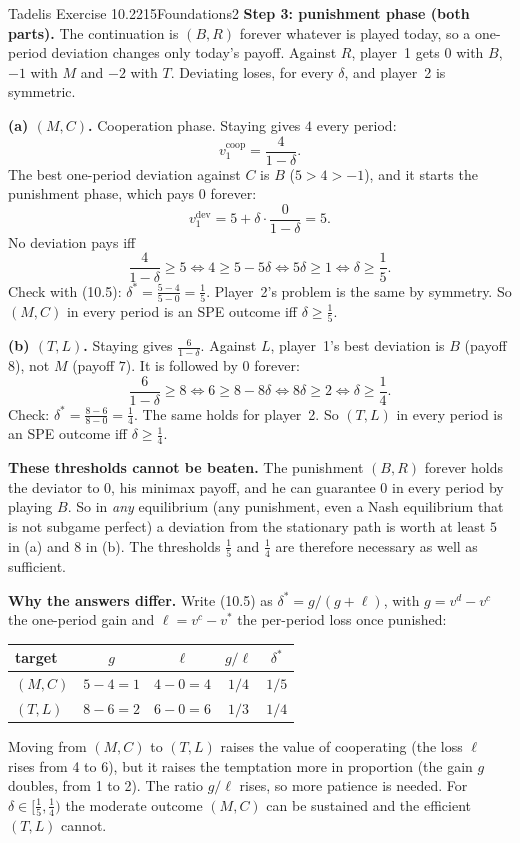 \begin{exsol}{Tadelis Exercise 10.2}{215}{Foundations}{2}
\textbf{Step 3: punishment phase (both parts).} The continuation is $(B,R)$ forever whatever is
played today, so a one-period deviation changes only today's payoff. Against $R$, player~1 gets
$0$ with $B$, $-1$ with $M$ and $-2$ with $T$. Deviating loses, for every $\delta$, and player~2 is
symmetric.

\textbf{(a) $(M,C)$.} Cooperation phase. Staying gives $4$ every period:
\[
  v_1^{\text{coop}} = \frac{4}{1-\delta} .
\]
The best one-period deviation against $C$ is $B$ ($5 > 4 > -1$), and it starts the punishment
phase, which pays $0$ forever:
\[
  v_1^{\text{dev}} = 5 + \delta\cdot\frac{0}{1-\delta} = 5 .
\]
No deviation pays iff
\[
  \frac{4}{1-\delta} \ge 5 \iff 4 \ge 5 - 5\delta \iff 5\delta \ge 1 \iff \delta \ge \frac15 .
\]
Check with (10.5): $\delta^* = \frac{5-4}{5-0} = \frac15$. Player~2's problem is the same by
symmetry. So $(M,C)$ in every period is an SPE outcome iff $\delta \ge \frac15$.

\textbf{(b) $(T,L)$.} Staying gives $\frac{6}{1-\delta}$. Against $L$, player~1's best deviation is
$B$ (payoff $8$), not $M$ (payoff $7$). It is followed by $0$ forever:
\[
  \frac{6}{1-\delta} \ge 8 \iff 6 \ge 8 - 8\delta \iff 8\delta \ge 2 \iff \delta \ge \frac14 .
\]
Check: $\delta^* = \frac{8-6}{8-0} = \frac14$. The same holds for player~2. So $(T,L)$ in every
period is an SPE outcome iff $\delta \ge \frac14$.

\textbf{These thresholds cannot be beaten.} The punishment $(B,R)$ forever holds the deviator to
$0$, his minimax payoff, and he can guarantee $0$ in every period by playing $B$. So in \emph{any}
equilibrium (any punishment, even a Nash equilibrium that is not subgame perfect) a deviation from
the stationary path is worth at least $5$ in (a) and $8$ in (b). The thresholds $\frac15$ and $\frac14$
are therefore necessary as well as sufficient.

\textbf{Why the answers differ.} Write (10.5) as $\delta^* = g/(g + \ell)$, with $g = v^d - v^c$ the
one-period gain and $\ell = v^c - v^*$ the per-period loss once punished:
\begin{center}
\begin{tabular}{lcccc}
\toprule
target & $g$ & $\ell$ & $g/\ell$ & $\delta^*$\\
\midrule
$(M,C)$ & $5-4 = 1$ & $4-0 = 4$ & $1/4$ & $1/5$\\
$(T,L)$ & $8-6 = 2$ & $6-0 = 6$ & $1/3$ & $1/4$\\
\bottomrule
\end{tabular}
\end{center}
Moving from $(M,C)$ to $(T,L)$ raises the value of cooperating (the loss $\ell$ rises from 4 to 6), but
it raises the temptation more in proportion (the gain $g$ doubles, from 1 to 2). The ratio $g/\ell$
rises, so more patience is needed. For $\delta \in [\frac15, \frac14)$ the moderate outcome $(M,C)$
can be sustained and the efficient $(T,L)$ cannot.


\end{exsol}
